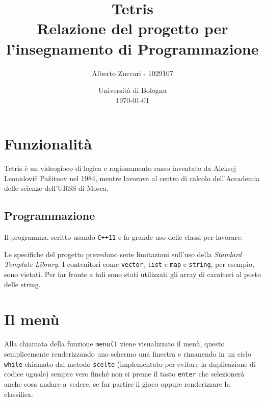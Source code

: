 \documentclass[a4paper]{article}
\title{Tetris \\
\large Relazione del progetto per l'insegnamento di Programmazione}
\author{
  Alberto Zuccari - 1029107
}
\date{
	Universit\`a di Bologna \\
  \today
}
\begin{document}
\maketitle
\thispagestyle{empty}

\section{Funzionalità}

Tetris è un videogioco di logica e ragionamento russo inventato da Aleksej Leonidovič Pažitnov nel 1984, mentre lavorava al centro di calcolo dell'Accademia delle scienze dell'URSS di Mosca.

\subsection{Programmazione}

Il programma, scritto usando \verb!C++11! e fa grande uso delle classi per lavorare.


\noindent
Le specifiche del progetto prevedono serie limitazioni sull'uso della \emph{Standard Template Library}. I contenitori come \verb!vector!, \verb!list! e \verb!map! e \verb!string!, per esempio, sono vietati. Per far fronte a tali sono stati utilizzati gli array di caratteri al posto delle string.

\section{Il menù}
Alla chiamata della funzione \verb!menu()! viene visualizzato il menù, questo semplicemente renderizzando uno schermo una finestra e rimanendo in un ciclo \verb!while! chiamato dal metodo \verb!scelte! (implementato per evitare la duplicazione di codice uguale) sempre vero finché non si preme il tasto \verb!enter! che selezionerà anche cosa andare a vedere, se far partire il gioco oppure renderizzare la classifica.
\end{document}
